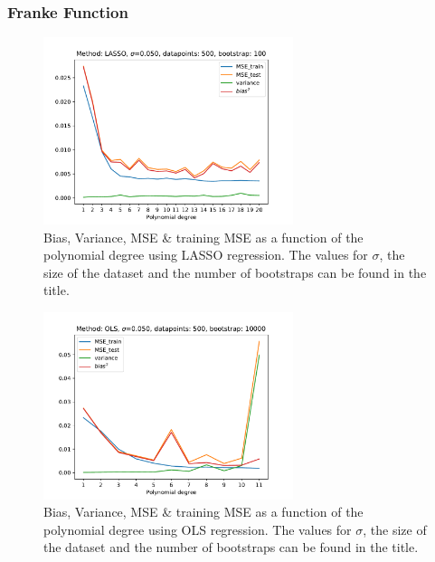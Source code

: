 \documentclass[11pt,a4paper,titlepage]{article}
\begin{document}
\subsubsection{Franke Function}
\begin{figure}[H]
\centering
\includegraphics[width=0.65\textwidth]{Bias_Variance_LASSO.pdf}
\caption[Bias, Variance, MSE \& training MSE as a function of the polynomial degree using LASSO regression]{Bias, Variance, MSE \& training MSE as a function of the polynomial degree using LASSO regression. The values for $\sigma$, the size of the dataset and the number of bootstraps can be found in the title.}
\label{fig:LASSO_Bias_Variance}
\end{figure}
\begin{figure}[H]
\centering
\includegraphics[width=0.65\textwidth]{Bias_Variance_OLS.pdf}
\caption[Bias, Variance, MSE \& training MSE as a function of the polynomial degree using OLS regression]{Bias, Variance, MSE \& training MSE as a function of the polynomial degree using OLS regression. The values for $\sigma$, the size of the dataset and the number of bootstraps can be found in the title.}
\label{fig:Bias_Variance}
\end{figure}
\end{document}
